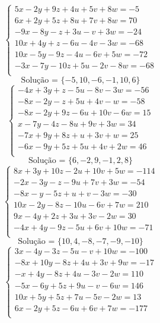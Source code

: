 \documentclass[12pt,oneside,a4paper]{article}
\begin{document}
\vspace{\baselineskip}
\begin{equation*}
\begin{cases}
5x-2y+9z+4u+5v+8w=-5 \\
6x+2y+5z+8u+7v+8w=70 \\
-9x-8y-z+3u-v+3w=-24 \\
10x+4y+z-6u-4v-3w=-68 \\
10x-5y-9z-4u-6v+5w=-72 \\
-3x-7y-10z+5u-2v-8w=-68 \\
\end{cases}
\end{equation*}
\begin{equation*}
\text{Solução = }\{-5,10,-6,-1,10,6\}
\end{equation*}
\vspace{\baselineskip}
\begin{equation*}
\begin{cases}
-4x+3y+z-5u-8v-3w=-56 \\
-8x-2y-z+5u+4v-w=-58 \\
-8x-2y+9z-6u+10v-6w=15 \\
x-7y-4z-8u+9v+3w=34 \\
-7x+9y+8z+u+3v+w=25 \\
-6x-9y+5z+5u+4v+2w=46 \\
\end{cases}
\end{equation*}
\begin{equation*}
\text{Solução = }\{6,-2,9,-1,2,8\}
\end{equation*}
\vspace{\baselineskip}
\begin{equation*}
\begin{cases}
8x+3y+10z-2u+10v+5w=-114 \\
-2x-3y-z-9u+7v+3w=-54 \\
-8x-y-5z+u+v-3w=-30 \\
10x-2y-8z-10u-6v+7w=210 \\
9x-4y+2z+3u+3v-2w=30 \\
-4x+4y-9z-5u+6v+10w=-71 \\
\end{cases}
\end{equation*}
\begin{equation*}
\text{Solução = }\{10,4,-8,-7,-9,-10\}
\end{equation*}
\vspace{\baselineskip}
\begin{equation*}
\begin{cases}
3x-4y-3z-5u-v+10w=-100 \\
-8x+10y-8z+4u+3v+9w=-17 \\
-x+4y-8z+4u-3v-2w=110 \\
-5x-6y+5z+9u-v-6w=146 \\
10x+5y+5z+7u-5v-2w=13 \\
6x-2y+5z-6u+6v+7w=-177 \\
\end{cases}
\end{equation*}
\end{document}
